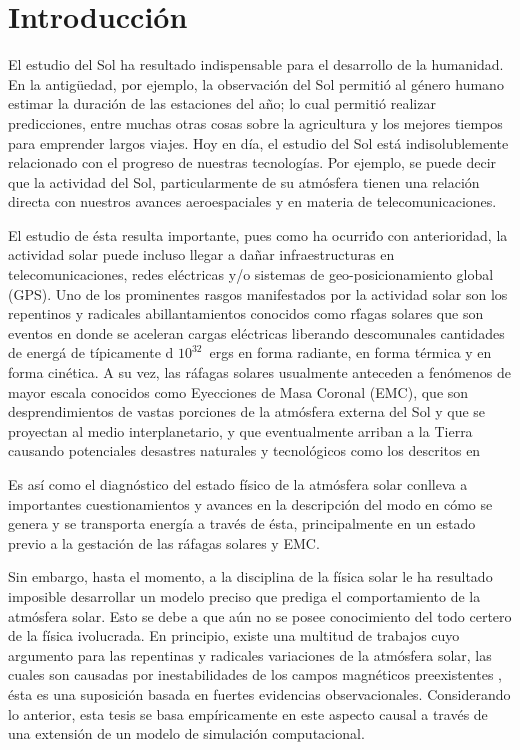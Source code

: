 \chapter{Introducci\'on}


El estudio del Sol ha resultado indispensable para el desarrollo de la humanidad. En la antig\"uedad, por ejemplo, la observaci\'on del Sol permiti\'o al g\'enero humano estimar la duraci\'on de las estaciones del a\~no; lo cual permiti\'o realizar predicciones, entre muchas otras cosas sobre la agricultura y los mejores tiempos para emprender largos viajes. Hoy en d\'ia, el estudio del Sol est\'a indisolublemente relacionado con el progreso de nuestras tecnolog\'ias. Por ejemplo, se puede decir que la actividad del Sol, particularmente de su atm\'osfera tienen una relaci\'on directa con nuestros avances aeroespaciales y en materia de telecomunicaciones.

El estudio de \'esta resulta importante, pues como ha ocurri\'do con anterioridad, la actividad solar puede incluso llegar a da\~nar infraestructuras en telecomunicaciones, redes el\'ectricas y/o sistemas de geo-posicionamiento global (GPS)\citep{carrington}. Uno de los prominentes rasgos manifestados por la actividad solar son los repentinos y radicales abillantamientos conocidos como r\'fagas solares que son eventos en donde se aceleran cargas el\'ectricas liberando descomunales cantidades de energ\'a de t\'ipicamente d $10^{32}$~ergs en forma radiante, en forma t\'ermica y en forma cin\'etica. A su vez, las r\'afagas solares usualmente anteceden a fen\'omenos de mayor escala conocidos como Eyecciones de Masa Coronal (EMC), que son desprendimientos de vastas porciones de la atm\'osfera externa del Sol y que se proyectan al medio interplanetario, y que eventualmente arriban a la Tierra causando potenciales desastres naturales y tecnol\'ogicos como los descritos en~\citep{carrington}

Es as\'i como el diagn\'ostico del estado f\'isico de la atm\'osfera solar conlleva a importantes cuestionamientos y avances en la descripci\'on del modo en c\'omo se genera y se transporta energ\'ia a trav\'es de \'esta, principalmente en un estado previo a la gestaci\'on de las r\'afagas solares y EMC.

Sin embargo, hasta el momento, a la disciplina de la f\'isica solar le ha resultado imposible desarrollar un modelo preciso que prediga el comportamiento de la atm\'osfera solar. Esto se debe a que a\'un no se posee conocimiento del todo certero de la f\'isica ivolucrada. En principio, existe una multitud de trabajos cuyo argumento para las repentinas y radicales variaciones de la atm\'osfera solar, las cuales son causadas por inestabilidades de los campos magn\'eticos preexistentes \citep{chromotemp}, \'esta es una suposici\'on basada en fuertes evidencias observacionales. Considerando lo anterior, esta tesis se basa emp\'iricamente en este aspecto causal a trav\'es de una extensi\'on de un modelo de simulaci\'on computacional.

